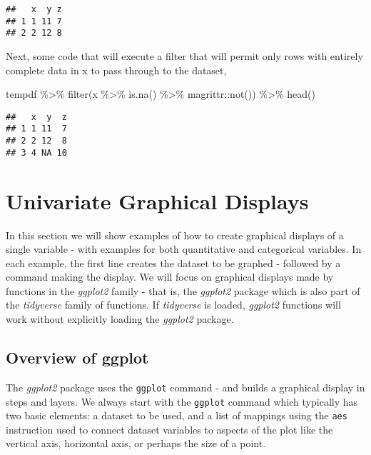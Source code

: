 \documentclass[
]{book}
\newenvironment{Shaded}{\begin{snugshade}}{\end{snugshade}}
\newcommand{\FunctionTok}[1]{\textcolor[rgb]{0.00,0.00,0.00}{#1}}
\newcommand{\NormalTok}[1]{#1}
\newcommand{\SpecialCharTok}[1]{\textcolor[rgb]{0.00,0.00,0.00}{#1}}
\begin{document}
\begin{verbatim}
##   x  y z
## 1 1 11 7
## 2 2 12 8
\end{verbatim}

Next, some code that will execute a filter that will permit only rows with entirely complete data in x to pass through to the dataset,

\begin{Shaded}
\begin{Highlighting}[]
\NormalTok{tempdf }\SpecialCharTok{\%\textgreater{}\%}
  \FunctionTok{filter}\NormalTok{(x }\SpecialCharTok{\%\textgreater{}\%} \FunctionTok{is.na}\NormalTok{() }\SpecialCharTok{\%\textgreater{}\%}\NormalTok{ magrittr}\SpecialCharTok{::}\FunctionTok{not}\NormalTok{()) }\SpecialCharTok{\%\textgreater{}\%}
  \FunctionTok{head}\NormalTok{()}
\end{Highlighting}
\end{Shaded}

\begin{verbatim}
##   x  y  z
## 1 1 11  7
## 2 2 12  8
## 3 4 NA 10
\end{verbatim}

\hypertarget{UnivariateGraphicalDisplays}{%
\chapter{Univariate Graphical Displays}\label{UnivariateGraphicalDisplays}}

In this section we will show examples of how to create graphical displays of a single variable - with examples for both quantitative and categorical variables.
In each example, the first line creates the dataset to be graphed - followed by a command making the display. We will focus on graphical displays made by functions in the \emph{ggplot2} family - that is, the \emph{ggplot2} package which is also part of the \emph{tidyverse} family of functions. If \emph{tidyverse} is loaded, \emph{ggplot2} functions will work without explicitly loading the \emph{ggplot2} package.

\hypertarget{overview-of-ggplot}{%
\section{Overview of ggplot}\label{overview-of-ggplot}}

The \emph{ggplot2} package uses the \texttt{ggplot} command - and builds a graphical display in steps and layers. We always start with the \texttt{ggplot} command which typically has two basic elements: a dataset to be used, and a list of mappings using the \texttt{aes} instruction used to connect dataset variables to aspects of the plot like the vertical axis, horizontal axis, or perhaps the size of a point.
\end{document}
